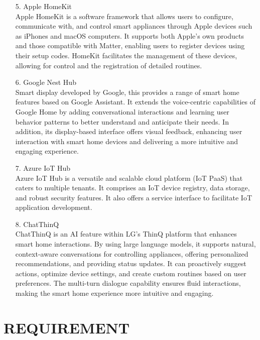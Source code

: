\documentclass[conference]{IEEEtran}
\begin{document}
\begin{itemize}
\\
\item [5.]Apple HomeKit\\
Apple HomeKit is a software framework that allows users to configure, communicate with, and control smart appliances through Apple devices such as iPhones and macOS computers. It supports both Apple’s own products and those compatible with Matter, enabling users to register devices using their setup codes. HomeKit facilitates the management of these devices, allowing for control and the registration of detailed routines.
\\
\item [6.]Google Nest Hub\\
Smart display developed by Google, this provides a range of smart home features based on Google Assistant. It extends the voice-centric capabilities of Google Home by adding conversational interactions and learning user behavior patterns to better understand and anticipate their needs. In addition, its display-based interface offers visual feedback, enhancing user interaction with smart home devices and delivering a more intuitive and engaging experience.
\\
\item [7.]Azure IoT Hub\\
Azure IoT Hub is a versatile and scalable cloud platform (IoT PaaS) that caters to multiple tenants. It comprises an IoT device registry, data storage, and robust security features. It also offers a service interface to facilitate IoT application development.
\\
\item [8.]ChatThinQ\\
ChatThinQ is an AI feature within LG's ThinQ platform that enhances smart home interactions. By using large language models, it supports natural, context-aware conversations for controlling appliances, offering personalized recommendations, and providing status updates. It can proactively suggest actions, optimize device settings, and create custom routines based on user preferences. The multi-turn dialogue capability ensures fluid interactions, making the smart home experience more intuitive and engaging.

\end{itemize}


\section{REQUIREMENT}
\end{document}
